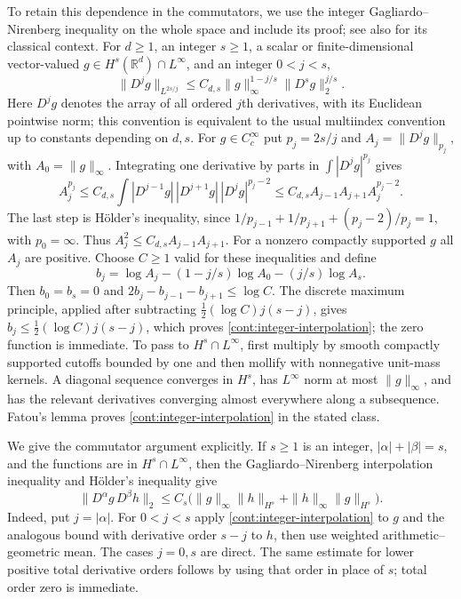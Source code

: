 To retain this dependence in the commutators, we use the integer
Gagliardo--Nirenberg inequality on the whole space and include its
proof; see also
\cite[Lecture~II]{Nirenberg1959} for its classical context.
For $d\ge1$, an integer $s\ge1$, a scalar or finite-dimensional
vector-valued $g\in H^s(\mathbb R^d)\cap L^\infty$, and an integer $0<j<s$,
\begin{equation}\label{cont:integer-interpolation}
 \|D^j g\|_{L^{2s/j}}
 \le C_{d,s}\|g\|_\infty^{1-j/s}
                   \|D^s g\|_2^{j/s}.
\end{equation}
Here $D^j g$ denotes the array of all ordered $j$th derivatives, with
its Euclidean pointwise norm; this convention is equivalent to the
usual multiindex convention up to constants depending on $d,s$.
For $g\in C_c^\infty$ put $p_j=2s/j$ and
$A_j=\|D^jg\|_{p_j}$, with $A_0=\|g\|_\infty$.
Integrating one derivative by parts in
$\int|D^jg|^{p_j}$ gives
\[
 A_j^{p_j}
 \le C_{d,s}\int |D^{j-1}g|\,|D^{j+1}g|\,
                         |D^jg|^{p_j-2}
 \le C_{d,s} A_{j-1}A_{j+1} A_j^{p_j-2}.
\]
The last step is H\"older's inequality, since
$1/p_{j-1}+1/p_{j+1}+(p_j-2)/p_j=1$, with $p_0=\infty$.
Thus $A_j^2\le C_{d,s}A_{j-1}A_{j+1}$.
For a nonzero compactly supported $g$ all $A_j$ are positive.
Choose $C\ge1$ valid for these inequalities and define
\[
 b_j=\log A_j-(1-j/s)\log A_0-(j/s)\log A_s.
\]
Then $b_0=b_s=0$ and
$2b_j-b_{j-1}-b_{j+1}\le\log C$.
The discrete maximum principle, applied after subtracting
$\tfrac12(\log C)j(s-j)$, gives
$b_j\le\tfrac12(\log C)j(s-j)$, which proves
\eqref{cont:integer-interpolation}; the zero function is immediate.
To pass to $H^s\cap L^\infty$, first multiply by smooth compactly
supported cutoffs bounded by one and then mollify with nonnegative
unit-mass kernels. A diagonal sequence converges in $H^s$, has
$L^\infty$ norm at most $\|g\|_\infty$, and has the relevant derivatives
converging almost everywhere along a subsequence. Fatou's lemma proves
\eqref{cont:integer-interpolation} in the stated class.

We give the commutator argument explicitly.  If $s\ge1$ is an integer,
$|\alpha|+|\beta|=s$, and the functions are in $H^s\cap L^\infty$,
then the Gagliardo--Nirenberg interpolation inequality and H\"older's
inequality give
\begin{equation}\label{cont:tame-product}
 \|D^\alpha g\,D^\beta h\|_2
 \le C_s\bigl(\|g\|_\infty\|h\|_{H^s}
                  +\|h\|_\infty\|g\|_{H^s}\bigr).
\end{equation}
Indeed, put $j=|\alpha|$. For $0<j<s$ apply
\eqref{cont:integer-interpolation} to $g$
and the analogous bound with derivative order $s-j$ to $h$, then use
weighted arithmetic--geometric mean.  The cases $j=0,s$ are direct.
The same estimate for lower positive total derivative orders follows
by using that order in place of $s$; total order zero is immediate.

